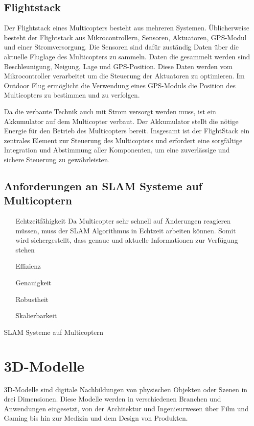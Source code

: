 \subsection{Flightstack}

Der Flightstack eines Multicopters besteht aus mehreren Systemen. Üblicherweise besteht der Flightstack aus Mikrocontrollern, Sensoren, Aktuatoren, GPS-Modul und einer Stromversorgung. Die Sensoren sind dafür zuständig Daten über die aktuelle Fluglage des Multicopters zu sammeln. Daten die gesammelt werden sind Beschleunigung, Neigung, Lage und GPS-Position. Diese Daten werden vom Mikrocontroller verarbeitet um die Steuerung der Aktuatoren zu optimieren. Im Outdoor Flug ermöglicht die Verwendung eines GPS-Moduls die Position des Multicopters zu bestimmen und zu verfolgen.

Da die verbaute Technik auch mit Strom versorgt werden muss, ist ein Akkumulator auf dem Multicopter verbaut. Der Akkumulator stellt die nötige Energie für den Betrieb des Multicopters bereit. Insgesamt ist der FlightStack ein zentrales Element zur Steuerung des Multicopters und erfordert eine sorgfältige Integration und Abstimmung aller Komponenten, um eine zuverlässige und sichere Steuerung zu gewährleisten.
\subsection{Anforderungen an SLAM Systeme auf Multicoptern}

\begin{itemize}
    \item[Echtzeitfähigkeit]{Da Multicopter sehr schnell auf Änderungen reagieren müssen, muss der SLAM Algorithmus in Echtzeit arbeiten können. Somit wird sichergestellt, dass genaue und aktuelle Informationen zur Verfügung stehen}
    \item[Effizienz]
    \item[Genauigkeit]
    \item[Robustheit]
    \item[Skalierbarkeit]    
\end{itemize}

\ac{SLAM} Systeme auf Multicoptern 

\section{3D-Modelle} \label{3d-modelle:section}
3D-Modelle sind digitale Nachbildungen von physischen Objekten oder Szenen in drei Dimensionen. Diese Modelle werden in verschiedenen Branchen und Anwendungen eingesetzt, von der Architektur und Ingenieurwesen über Film und Gaming bis hin zur Medizin und dem Design von Produkten.


